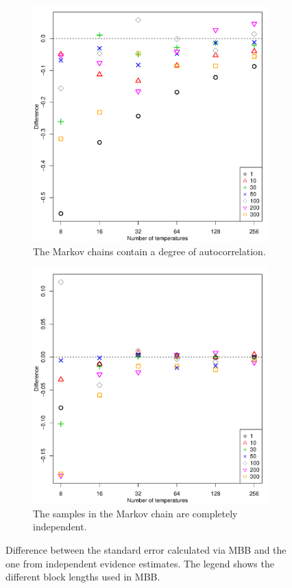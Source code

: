 \documentclass[aps,reprint,amsmath,amssymb,showpacs,showkeys]{revtex4-1}%
\begin{document}
\begin{figure}[]
	\begin{subfigure}{0.50\textwidth}
	\centering 
	\includegraphics[scale=0.45,clip=true,angle=0]{ErrorEstimates_DepMC.pdf}
	\caption{The Markov chains contain a degree of autocorrelation.}
	\label{fig2a}
	\end{subfigure}
	\begin{subfigure}{0.50\textwidth}
	\centering 
	\includegraphics[scale=0.45,clip=true,angle=0]{ErrorEstimates_IndMC.pdf}
	\caption{The samples in the Markov chain are completely independent.}
	\label{fig2b}
	\end{subfigure}
	\caption{Difference between the standard error calculated via MBB and the one from independent evidence estimates.  The legend shows the different block lengths used in MBB.}
	\label{fig2}
\end{figure}
\end{document}
